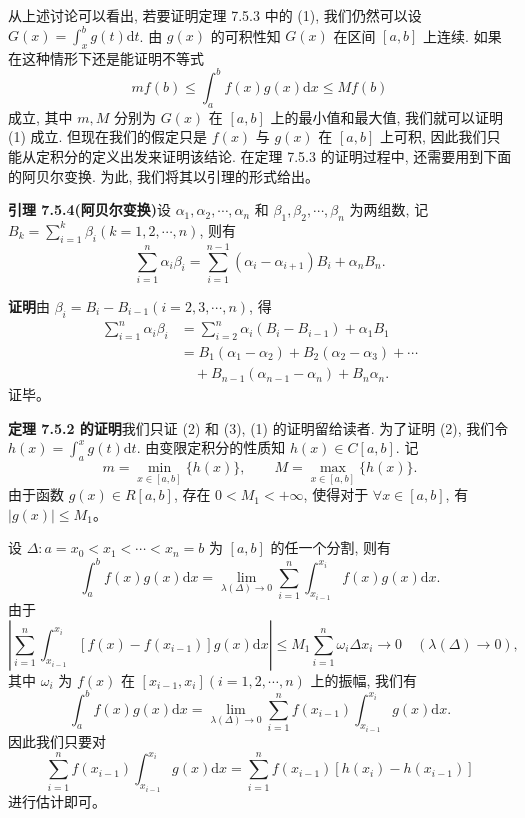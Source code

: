 \documentclass[UTF8,12pt,a4paper,fontset=fandol]{ctexart}
\begin{document}
从上述讨论可以看出, 若要证明定理 7.5.3 中的 (1), 我们仍然可以设 $G(x)=\int_x^b g(t)\mathrm dt$. 由 $g(x)$ 的可积性知 $G(x)$ 在区间 $[a,b]$ 上连续. 如果在这种情形下还是能证明不等式
\[
  mf(b)\leq\int_a^b f(x)g(x)\mathrm dx\leq Mf(b)
\]
成立, 其中 $m,M$ 分别为 $G(x)$ 在 $[a,b]$ 上的最小值和最大值, 我们就可以证明 (1) 成立. 但现在我们的假定只是 $f(x)$ 与 $g(x)$ 在 $[a,b]$ 上可积, 因此我们只能从定积分的定义出发来证明该结论. 在定理 7.5.3 的证明过程中, 还需要用到下面的阿贝尔变换. 为此, 我们将其以引理的形式给出。

\noindent\textbf{引理 7.5.4(阿贝尔变换)}\quad 设 $\alpha_1,\alpha_2,\cdots,\alpha_n$ 和 $\beta_1,\beta_2,\cdots,\beta_n$ 为两组数, 记 $B_k=\sum_{i=1}^k\beta_i(k=1,2,\cdots,n)$, 则有
\[
  \sum_{i=1}^n\alpha_i\beta_i
  =\sum_{i=1}^{n-1}(\alpha_i-\alpha_{i+1})B_i+\alpha_nB_n.
\]

\noindent\textbf{证明}\quad 由 $\beta_i=B_i-B_{i-1}(i=2,3,\cdots,n)$, 得
\[
\begin{aligned}
  \sum_{i=1}^n\alpha_i\beta_i
  &=\sum_{i=2}^n\alpha_i(B_i-B_{i-1})+\alpha_1B_1\\
  &=B_1(\alpha_1-\alpha_2)+B_2(\alpha_2-\alpha_3)+\cdots\\
  &\quad+B_{n-1}(\alpha_{n-1}-\alpha_n)+B_n\alpha_n.
\end{aligned}
\]
证毕。

\noindent\textbf{定理 7.5.2 的证明}\quad 我们只证 (2) 和 (3), (1) 的证明留给读者. 为了证明 (2), 我们令 $h(x)=\int_a^x g(t)\mathrm dt$. 由变限定积分的性质知 $h(x)\in C[a,b]$. 记
\[
  m=\min_{x\in[a,b]}\{h(x)\},\qquad
  M=\max_{x\in[a,b]}\{h(x)\}.
\]
由于函数 $g(x)\in R[a,b]$, 存在 $0<M_1<+\infty$, 使得对于 $\forall x\in[a,b]$, 有 $|g(x)|\leq M_1$。

设 $\Delta:a=x_0<x_1<\cdots<x_n=b$ 为 $[a,b]$ 的任一个分割, 则有
\[
  \int_a^b f(x)g(x)\mathrm dx
  =\lim_{\lambda(\Delta)\to0}\sum_{i=1}^n\int_{x_{i-1}}^{x_i} f(x)g(x)\mathrm dx.
\]
由于
\[
  \left|\sum_{i=1}^n\int_{x_{i-1}}^{x_i}[f(x)-f(x_{i-1})]g(x)\mathrm dx\right|
  \leq M_1\sum_{i=1}^n\omega_i\Delta x_i\to0\quad(\lambda(\Delta)\to0),
\]
其中 $\omega_i$ 为 $f(x)$ 在 $[x_{i-1},x_i](i=1,2,\cdots,n)$ 上的振幅, 我们有
\[
  \int_a^b f(x)g(x)\mathrm dx
  =\lim_{\lambda(\Delta)\to0}\sum_{i=1}^n f(x_{i-1})\int_{x_{i-1}}^{x_i}g(x)\mathrm dx.
\]
因此我们只要对
\[
  \sum_{i=1}^n f(x_{i-1})\int_{x_{i-1}}^{x_i}g(x)\mathrm dx
  =\sum_{i=1}^n f(x_{i-1})[h(x_i)-h(x_{i-1})]
\]
进行估计即可。
\end{document}
